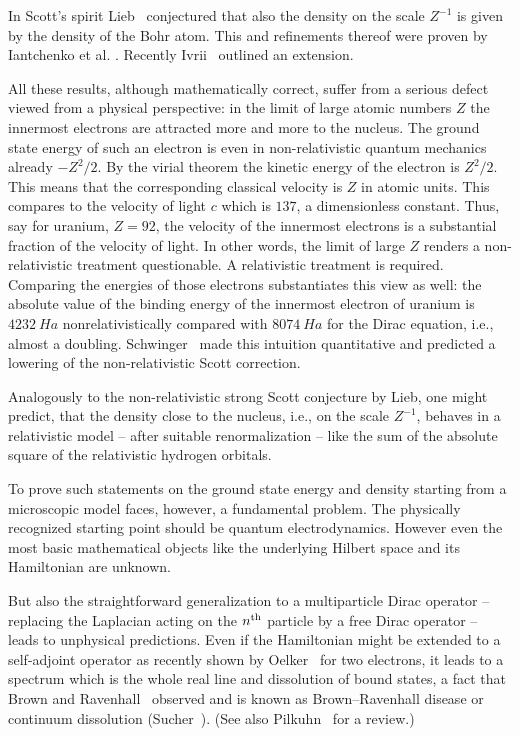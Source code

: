 \documentclass[AHL,Unicode,longabstracts,published]{cedram}
\begin{document}
In Scott's spirit Lieb~\cite{Lieb1981} conjectured that also the density on the scale $Z^{-1}$ is given by the density of the Bohr atom. This and refinements thereof were proven by Iantchenko et al. \cite{Iantchenko1997,Iantchenkoetal1996,IantchenkoSiedentop2001}. Recently Ivrii~\cite{Ivrii2019} outlined an extension.

All these results, although mathematically correct, suffer from a serious defect viewed from a physical perspective: in the limit of large atomic numbers $Z$ the innermost electrons are attracted more and more to the nucleus. The ground state energy of such an electron is even in non-relativistic quantum mechanics already $-Z^2/2$. By the virial theorem the kinetic energy of the electron is $Z^2/2$. This means that the corresponding classical velocity is $Z$ in atomic units. This compares to the velocity of light $c$ which is $137$, a dimensionless constant. Thus, say for uranium, $Z=92$, the velocity of the innermost electrons is a substantial fraction of the velocity of light. In other words, the limit of large $Z$ renders a non-relativistic treatment questionable. A relativistic treatment is required. Comparing the energies of those electrons substantiates this view as well: the absolute value of the binding energy of the innermost electron of uranium is $4232\ Ha$ nonrelativistically compared with $8074\ Ha$ for the Dirac equation, i.e., almost a doubling. Schwinger~\cite{Schwinger1980} made this intuition quantitative and predicted a lowering of the non-relativistic Scott correction.

Analogously to the non-relativistic strong Scott conjecture by Lieb, one might predict, that the density close to the nucleus, i.e., on the scale $Z^{-1}$, behaves in a relativistic model -- after suitable renormalization -- like the sum of the absolute square of the relativistic hydrogen orbitals.

To prove such statements on the ground state energy and density starting from a microscopic model faces, however, a fundamental problem. The physically recognized starting point should be quantum electrodynamics. However even the most basic mathematical objects like the underlying Hilbert space and its Hamiltonian are unknown.

But also the straightforward generalization to a multiparticle Dirac operator -- replacing the Laplacian acting on the $n^{\rm th}$ particle by a free Dirac operator -- leads to unphysical predictions. Even if the Hamiltonian might be extended to a self-adjoint operator as recently shown by Oelker~\cite{Oelker2019} for two electrons, it leads to a spectrum which is the whole real line and dissolution of bound states, a fact that Brown and Ravenhall~\cite{BrownRavenhall1951} observed and is known as Brown--Ravenhall disease or continuum dissolution (Sucher~\cite{Sucher1980}). (See also Pilkuhn~\cite[Section~3.7]{Pilkuhn2005} for a review.)
\end{document}

